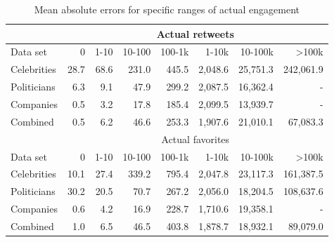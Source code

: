 \begin{table}
  \begin{tabular}{lrrrrrrr}
    \toprule
    & \multicolumn{7}{c}{Actual retweets} \\
    \midrule
    Data set & 0 & 1-10 & 10-100 & 100-1k & 1-10k & 10-100k & >100k \\
    \midrule
    Celebrities & 28.7 & 68.6 & 231.0 & 445.5 & 2,048.6 & 25,751.3 & 242,061.9 \\
    Politicians & 6.3 & 9.1 & 47.9 & 299.2 & 2,087.5 & 16,362.4 & - \\
    Companies & 0.5 & 3.2 & 17.8 & 185.4 & 2,099.5 & 13,939.7 & - \\
    Combined & 0.5 & 6.2 & 46.6 & 253.3 & 1,907.6 & 21,010.1 & 67,083.3 \\
    \bottomrule
    \toprule
    & \multicolumn{7}{c}{Actual favorites} \\
    \midrule
    Data set & 0 & 1-10 & 10-100 & 100-1k & 1-10k & 10-100k & >100k \\
    \midrule
    Celebrities & 10.1 & 27.4 & 339.2 & 795.4 & 2,047.8 & 23,117.3 & 161,387.5 \\
    Politicians & 30.2 & 20.5 & 70.7 & 267.2 & 2,056.0 & 18,204.5 & 108,637.6 \\
    Companies & 0.6 & 4.2 & 16.9 & 228.7 & 1,710.6 & 19,358.1 & - \\
    Combined & 1.0 & 6.5 & 46.5 & 403.8 & 1,878.7 & 18,932.1 & 89,079.0 \\
    \bottomrule
  \end{tabular}
  \caption[Detailed regression results for multi-input deep neural networks]{Mean absolute errors for specific ranges of actual engagement}
  \label{tab:d1_regression_eval}
\end{table}

